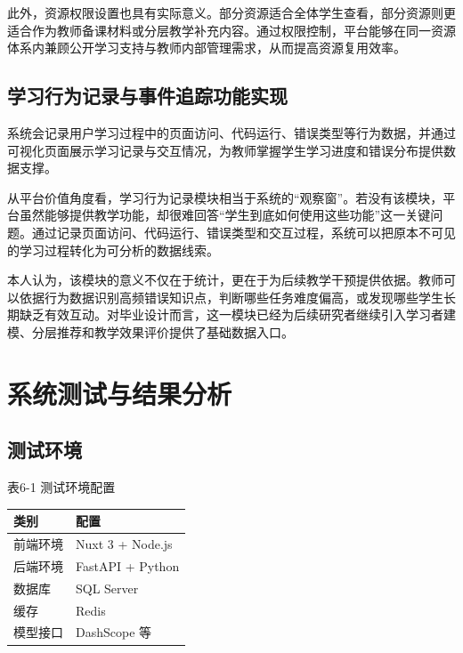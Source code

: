 此外，资源权限设置也具有实际意义。部分资源适合全体学生查看，部分资源则更适合作为教师备课材料或分层教学补充内容。通过权限控制，平台能够在同一资源体系内兼顾公开学习支持与教师内部管理需求，从而提高资源复用效率。

\section{学习行为记录与事件追踪功能实现}\label{ux5b66ux4e60ux884cux4e3aux8bb0ux5f55ux4e0eux4e8bux4ef6ux8ffdux8e2aux529fux80fdux5b9eux73b0}

系统会记录用户学习过程中的页面访问、代码运行、错误类型等行为数据，并通过可视化页面展示学习记录与交互情况，为教师掌握学生学习进度和错误分布提供数据支撑。

从平台价值角度看，学习行为记录模块相当于系统的``观察窗''。若没有该模块，平台虽然能够提供教学功能，却很难回答``学生到底如何使用这些功能''这一关键问题。通过记录页面访问、代码运行、错误类型和交互过程，系统可以把原本不可见的学习过程转化为可分析的数据线索。

本人认为，该模块的意义不仅在于统计，更在于为后续教学干预提供依据。教师可以依据行为数据识别高频错误知识点，判断哪些任务难度偏高，或发现哪些学生长期缺乏有效互动。对毕业设计而言，这一模块已经为后续研究者继续引入学习者建模、分层推荐和教学效果评价提供了基础数据入口。

\chapter{系统测试与结果分析}\label{ux7cfbux7edfux6d4bux8bd5ux4e0eux7ed3ux679cux5206ux6790}

\section{测试环境}\label{ux6d4bux8bd5ux73afux5883}

表6-1 测试环境配置

\begin{longtable}[]{@{}ll@{}}
\toprule\noalign{}
类别 & 配置 \\
\midrule\noalign{}
\endhead
\bottomrule\noalign{}
\endlastfoot
前端环境 & Nuxt 3 + Node.js \\
后端环境 & FastAPI + Python \\
数据库 & SQL Server \\
缓存 & Redis \\
模型接口 & DashScope 等 \\
\end{longtable}

